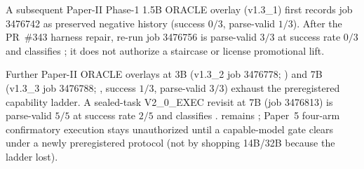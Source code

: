 A subsequent Paper-II Phase-1 1.5B ORACLE overlay (v1.3\_1) first records job 3476742 as preserved  negative history (success $0/3$, parse-valid $1/3$).  After the PR~\#343 harness repair, re-run job 3476756 is parse-valid $3/3$ at success rate $0/3$ and classifies ; it does not authorize a staircase or license promotional lift.

Further Paper-II ORACLE overlays at 3B (v1.3\_2 job 3476778;
) and 7B (v1.3\_3 job 3476788;
, success $1/3$, parse-valid $3/3$) exhaust the
preregistered capability ladder.  A sealed-task V2\_0\_EXEC revisit at 7B
(job 3476813) is parse-valid $5/5$ at success rate $2/5$ and classifies
.   remains
; Paper~5 four-arm confirmatory execution stays unauthorized
until a capable-model gate clears under a newly preregistered protocol (not by
shopping 14B/32B because the ladder lost).
